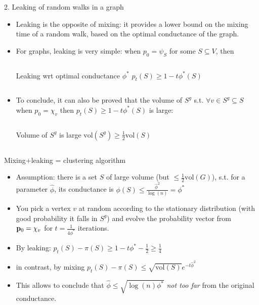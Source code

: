 \documentclass[../main.tex]{subfiles}
\begin{document}
    \begin{frame}{2. Leaking of random walks in a graph}
        \begin{itemize}
            \item Leaking is the opposite of mixing: it provides a lower bound on the mixing time of a random walk, based on the optimal conductance of the graph.
            \item For graphs, leaking is very simple: when $p_0= \psi_S$ for some $S\subseteq V$, then
                \begin{columns}
                    \begin{block}{Leaking wrt optimal conductance $\phi^*$}
                        $p_t(S) \geq 1 - t\phi^*(S)$
                    \end{block}
                \end{columns}
            \item To conclude, it can also be proved that the volume of $S^g$ s.t. $\forall v\in S^g\subseteq S$ when $p_0 = \chi_v$ then $p_t(S)\geq 1-t\phi^*(S)$ is large:
                \begin{columns}
                    \begin{block}{Volume of $S^g$ is large}
                        $\text{vol}(S^g) \geq \frac{1}{2}\text{vol}(S)$
                    \end{block}
                \end{columns}
        \end{itemize}
    \end{frame}
    
    \begin{frame}{Mixing+leaking = clustering algorithm}
        \begin{itemize}
            \item Assumption: there is a set $S$ of large volume (but $\leq \frac{1}{2}\text{vol}(G)$), s.t. for a parameter $\hat{\phi}$, its conductance is $\phi(S) \leq \frac{\hat{\phi}^2}{\log(n)} = \phi^*$
            \item You pick a vertex $v$ at random according to the stationary distribution (with good probability it falls in $S^g$) and evolve the probability vector from $\bold{p}_0 = \chi_v$ for $t=\frac{1}{4\phi^*}$ iterations.
            \item By leaking: $p_t(S) - \pi(S) \geq 1 - t\phi^* - \frac{1}{2} \geq \frac{1}{4}$
            \item in contrast, by mixing $p_t(S) - \pi(S) \leq \sqrt{\text{vol}(S)}e^{-t\hat{\phi}^2}$
            \item This allows to conclude that $\hat{\phi} \leq \sqrt{\log(n) \phi^*}$ \textit{not too far} from the original conductance.
        \end{itemize}
    \end{frame}
    
\end{document}
